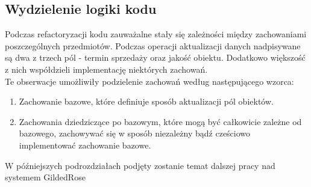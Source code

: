 \documentclass[a4paper, 11pt]{article}
\begin{document}
\subsection{Wydzielenie logiki kodu}
Podczas refactoryzacji kodu zauważalne stały się zależności między zachowaniami poszczególnych przedmiotów. Podczas operacji aktualizacji danych nadpisywane są dwa z trzech pól - termin sprzedaży oraz jakość obiektu. Dodatkowo większość z nich współdzieli implementację niektórych zachowań.\\
Te obserwacje umożliwiły podzielenie zachowań według następującego wzorca:
\begin{enumerate}
 \item Zachowanie bazowe, które definiuje sposób aktualizacji pól obiektów.
 \item Zachowania dziedziczące po bazowym, które mogą być całkowicie zależne od bazowego, zachowywać się w sposób niezależny bądź cześciowo implementować zachowanie bazowe.
\end{enumerate}
W późniejszych podrozdziałach podjęty zostanie temat dalszej pracy nad systemem GildedRose
\end{document}
